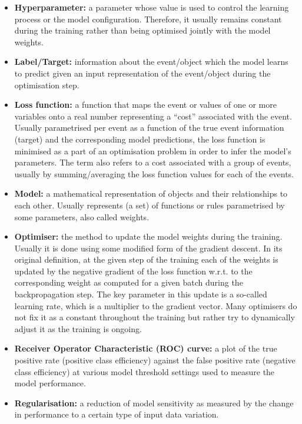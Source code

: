 \begin{itemize}
	\item[] \textbf{Hyperparameter:} a parameter whose value is used to control the learning process or the model configuration. Therefore, it usually remains constant during the training rather than being optimised jointly with the model weights.

    \item[] \textbf{Label/Target:} information about the event/object which the model learns to predict given an input representation of the event/object during the optimisation step. 
    
    \item[] \textbf{Loss function:} a function that maps the event or values of one or more variables onto a real number representing a \enquote{cost} associated with the event. Usually parametrised per event as a function of the true event information (target) and the corresponding model predictions, the loss function is minimised as a part of an optimisation problem in order to infer the model's parameters. The term also refers to a cost associated with a group of events, usually by summing/averaging the loss function values for each of the events.

    \item[] \textbf{Model:} a mathematical representation of objects and their relationships to each other. Usually represents (a set) of functions or rules parametrised by some parameters, also called weights.

	\item[] \textbf{Optimiser:} the method to update the model weights during the training. Usually it is done using some modified form of the gradient descent. In its original definition, at the given step of the training each of the weights is updated by the negative gradient of the loss function w.r.t. to the corresponding weight as computed for a given batch during the backpropagation step. The key parameter in this update is a so-called learning rate, which is a multiplier to the gradient vector. Many optimisers do not fix it as a constant throughout the training but rather try to dynamically adjust it as the training is ongoing.

	\item[] \textbf{Receiver Operator Characteristic (ROC) curve:} a plot of the true positive rate (positive class efficiency) against the false positive rate (negative class efficiency) at various model threshold settings used to measure the model performance.
 
	\item[] \textbf{Regularisation:} a reduction of model sensitivity as measured by the change in performance to a certain type of input data variation.
    

\end{itemize}
